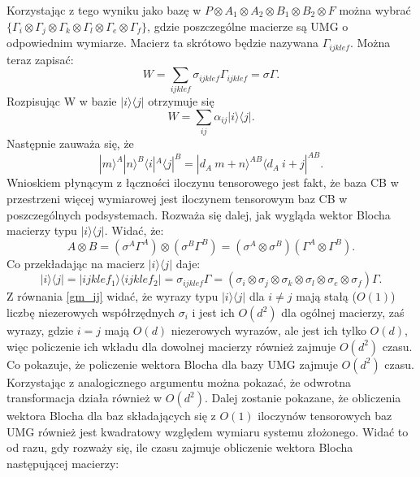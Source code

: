 \documentclass[10pt]{article} %
\newcommand{\Ket}[1]{|#1\rangle}
\newcommand{\Bra}[1]{\langle#1|}
\begin{document}
\begin{appendices}
Korzystając z tego wyniku jako bazę w $P \otimes A_1 \otimes A_2 \otimes B_1 \otimes B_2 \otimes F$ można wybrać $\{ \Gamma_i \otimes \Gamma_j \otimes \Gamma_k \otimes \Gamma_l \otimes \Gamma_e \otimes \Gamma_f\}$, gdzie poszczególne macierze są UMG o odpowiednim wymiarze. Macierz ta skrótowo będzie nazywana $\Gamma_{ijklef}$.
Można teraz zapisać:
\begin{equation}
\label{WGM}
W = \sum_{ijklef} \sigma_{ijklef} \Gamma_{ijklef} = \sigma \Gamma.
\end{equation}
Rozpisując W w bazie $\Ket{i}\Bra{j}$ otrzymuje się
\begin{equation}
W = \sum_{ij} \alpha_{ij} \Ket{i}\Bra{j}.
\end{equation}
Następnie zauważa się, że
\begin{equation}
\Ket{m}^A\Ket{n}^B\Bra{i}^A\Bra{j}^B = \Ket{d_A~m+n}^{AB}\Bra{d_A~i+j}^{AB}.
\end{equation} Wnioskiem płynącym z łączności iloczynu tensorowego jest fakt, że baza CB w przestrzeni więcej wymiarowej jest iloczynem tensorowym baz CB w poszczególnych podsystemach.
Rozważa się dalej, jak wygląda wektor Blocha macierzy typu $\Ket{i}\Bra{j}$.
Widać, że:
\begin{equation}
A \otimes B = (\sigma^A \Gamma^A) \otimes (\sigma^B \Gamma^B) = (\sigma^A \otimes \sigma^B) (\Gamma^A \otimes \Gamma^B).
\end{equation} Co przekładając na macierz $\Ket{i}\Bra{j}$ daje:
\begin{equation}
\Ket{i}\Bra{j}=\Ket{ijklef_1}\Bra{ijklef_2} =  \sigma_{ijklef} \Gamma = (\sigma_i \otimes \sigma_j \otimes \sigma_k \otimes \sigma_l \otimes \sigma_e \otimes \sigma_f) \Gamma.
\end{equation}
Z równania \eqref{gm_ij} widać, że wyrazy typu $\Ket{i}\Bra{j}$ dla $i \neq j$ mają stałą ($O(1)$) liczbę niezerowych współrzędnych $\sigma_i$ i jest ich $O(d^2)$ dla ogólnej macierzy, zaś wyrazy, gdzie $i = j$ mają $O(d)$ niezerowych wyrazów, ale jest ich tylko $O(d)$, więc policzenie ich wkładu dla dowolnej macierzy również zajmuje 
$O(d^2)$ czasu. Co pokazuje, że policzenie wektora Blocha dla bazy UMG zajmuje $O(d^2)$ czasu. Korzystając z analogicznego argumentu można pokazać, że odwrotna transformacja działa również w $O(d^2)$. Dalej zostanie pokazane, że obliczenia wektora Blocha dla baz składających się z $O(1)$ iloczynów tensorowych baz UMG również jest kwadratowy względem wymiaru systemu złożonego. Widać to od razu, gdy rozważy się, ile czasu zajmuje obliczenie wektora Blocha następującej macierzy:

\end{appendices}
\end{document}
